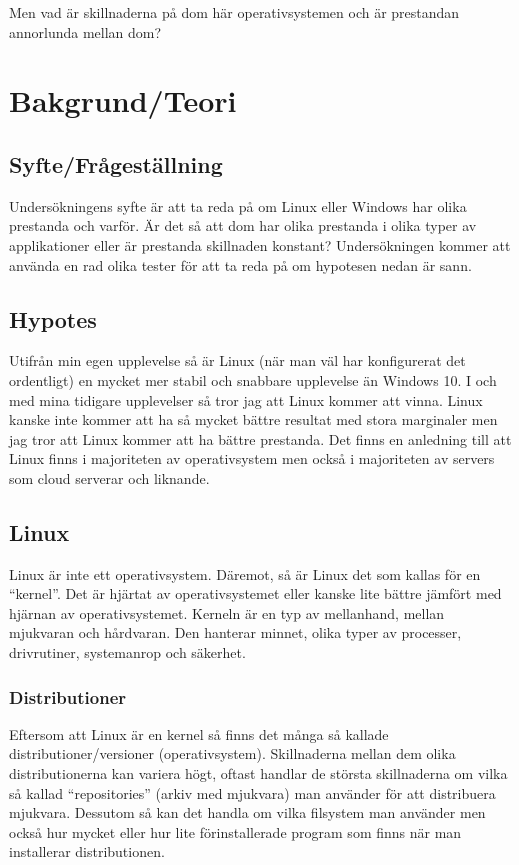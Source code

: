 \documentclass[12pt, a4paper]{report}
\begin{document}
    Men vad är skillnaderna på dom här operativsystemen och är prestandan annorlunda mellan dom?
    
\section{Bakgrund/Teori}


    \subsection{Syfte/Frågeställning}
    Undersökningens syfte är att ta reda på om Linux eller Windows har olika prestanda och varför. Är det så att dom har olika prestanda i olika typer av applikationer eller är prestanda skillnaden konstant? Undersökningen kommer att använda en rad olika tester för att ta reda på om hypotesen nedan är sann.
 

    \subsection{Hypotes}

    Utifrån min egen upplevelse så är Linux (när man väl har konfigurerat det ordentligt) en mycket mer stabil och snabbare upplevelse än Windows 10. I och med mina tidigare upplevelser så tror jag att Linux kommer att vinna. Linux kanske inte kommer att ha så mycket bättre resultat med stora marginaler men jag tror att Linux kommer att ha bättre prestanda.
    Det finns en anledning till att Linux finns i majoriteten av operativsystem men också i majoriteten av servers som cloud serverar och liknande.
 

    \subsection{Linux}
 
   Linux är inte ett operativsystem. Däremot, så är Linux det som kallas för en ``kernel''\cite{redhat}. Det är hjärtat av operativsystemet eller kanske lite bättre jämfört med hjärnan av operativsystemet. Kerneln är en typ av mellanhand, mellan mjukvaran och hårdvaran. Den hanterar minnet, olika typer av processer, drivrutiner, systemanrop och säkerhet\cite{redhat}.
 

    \subsubsection{Distributioner}

   Eftersom att Linux är en kernel så finns det många så kallade distributioner/versioner (operativsystem). Skillnaderna mellan dem olika distributionerna kan variera högt, oftast handlar de största skillnaderna om vilka så kallad ``repositories'' (arkiv med mjukvara) man använder för att distribuera mjukvara. Dessutom så kan det handla om vilka filsystem man använder men också hur mycket eller hur lite förinstallerade program som finns när man installerar distributionen.
\end{document}
